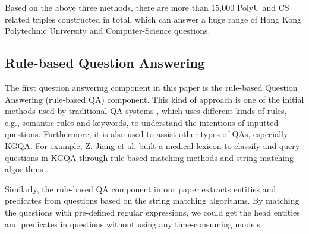\documentclass[11pt]{article}
\begin{document}
Based on the above three methods, there are more than $15$,$000$ PolyU and CS related triples constructed in total, which can answer a huge range of Hong Kong Polytechnic University and Computer-Science questions.






\subsection{Rule-based Question Answering}\label{sec:RULE-BASED QA}
The first question answering component in this paper is the rule-based Question Answering (rule-based QA) component. This kind of approach is one of the initial methods used by traditional QA systems \cite{c30}, which uses different kinds of rules, e.g., semantic rules and keywords, to understand the intentions of inputted questions. Furthermore, it is also used to assist other types of QAs, especially KGQA. For example, Z. Jiang et al. built a medical lexicon to classify and query questions in KGQA through rule-based matching methods and string-matching algorithms \cite{c31}.

Similarly, the rule-based QA component in our paper extracts entities and predicates from questions based on the string matching algorithms. By matching the questions with pre-defined regular expressions, we could get the head entities and predicates in questions without using any time-consuming models.
\end{document}
